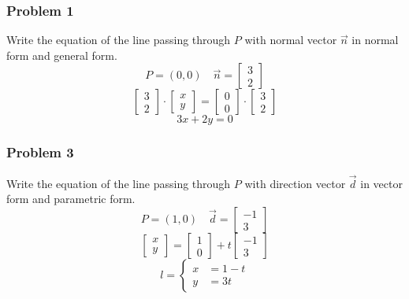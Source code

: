 \documentclass[letterpaper, 12pt]{math}
\begin{document}
\subsubsection*{Problem 1}
Write the equation of the line passing through \( P \) with normal vector
\( \vec{n} \) in normal form and general form.
\[ P = (0,0) \quad \vec{n} = \begin{bmatrix}3 \\ 2\end{bmatrix} \]
\[ \begin{bmatrix}3 \\ 2\end{bmatrix}\cdot\begin{bmatrix}x \\ y\end{bmatrix} =
  \begin{bmatrix}0 \\ 0\end{bmatrix}\cdot\begin{bmatrix}3 \\ 2\end{bmatrix} \]
\[ 3x+2y = 0 \]

\subsubsection*{Problem 3}
Write the equation of the line passing through \( P \) with direction vector
\( \vec{d} \) in vector form and parametric form.
\[ P = (1,0) \quad \vec{d} = \begin{bmatrix}-1 \\ 3\end{bmatrix} \]
\[ \begin{bmatrix}x \\ y\end{bmatrix} =
  \begin{bmatrix}1 \\ 0\end{bmatrix}+t\begin{bmatrix}-1 \\ 3\end{bmatrix} \]
\[ l = \begin{cases}
  x &= 1-t \\
  y &= 3t
\end{cases} \]
\end{document}
